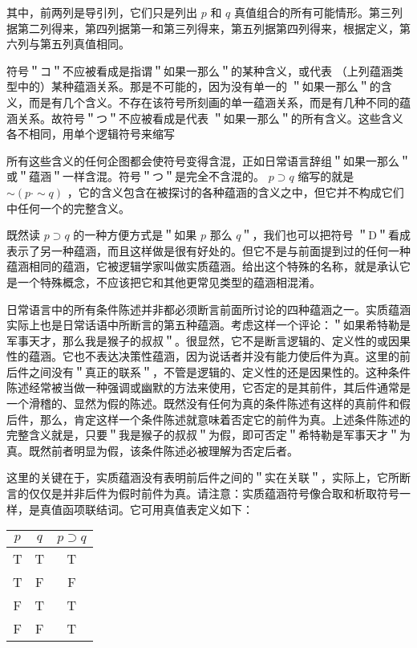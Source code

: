 其中，前两列是导引列，它们只是列出 $p$ 和 $q$ 真值组合的所有可能情形。第三列据第二列得来，第四列据第一和第三列得来，第五列据第四列得来，根据定义，第六列与第五列真值相同。

符号＂コ＂不应被看成是指谓＂如果一那么＂的某种含义，或代表 （上列蕴涵类型中的）某种蕴涵关系。那是不可能的，因为没有单一的 ＂如果一那么＂的含义，而是有几个含义。不存在该符号所刻画的单一蕴涵关系，而是有几种不同的蕴涵关系。故符号＂つ＂不应被看成是代表 ＂如果一那么＂的所有含义。这些含义各不相同，用单个逻辑符号来缩写

所有这些含义的任何企图都会使符号变得含混，正如日常语言辞组＂如果一那么＂或＂蕴涵＂一样含混。符号＂つ＂是完全不含混的。 $p \supset q$ 缩写的就是 $\sim(p \cdot \sim q)$ ，它的含义包含在被探讨的各种蕴涵的含义之中，但它并不构成它们中任何一个的完整含义。

既然读 $p \supset q$ 的一种方便方式是＂如果 $p$ 那么 $q$＂，我们也可以把符号 ＂D＂看成表示了另一种蕴涵，而且这样做是很有好处的。但它不是与前面提到过的任何一种蕴涵相同的蕴涵，它被逻辑学家叫做实质蕴涵。给出这个特殊的名称，就是承认它是一个特殊概念，不应该把它和其他更常见类型的蕴涵相混淆。

日常语言中的所有条件陈述并非都必须断言前面所讨论的四种蕴涵之一。实质蕴涵实际上也是日常话语中所断言的第五种蕴涵。考虑这样一个评论：＂如果希特勒是军事天才，那么我是猴子的叔叔＂。很显然，它不是断言逻辑的、定义性的或因果性的蕴涵。它也不表达决策性蕴涵，因为说话者并没有能力使后件为真。这里的前后件之间没有＂真正的联系＂，不管是逻辑的、定义性的还是因果性的。这种条件陈述经常被当做一种强调或幽默的方法来使用，它否定的是其前件，其后件通常是一个滑稽的、显然为假的陈述。既然没有任何为真的条件陈述有这样的真前件和假后件，那么，肯定这样一个条件陈述就意味着否定它的前件为真。上述条件陈述的完整含义就是，只要＂我是猴子的叔叔＂为假，即可否定＂希特勒是军事天才＂为真。既然前者明显为假，该条件陈述必被理解为否定后者。

这里的关键在于，实质蕴涵没有表明前后件之间的＂实在关联＂，实际上，它所断言的仅仅是并非后件为假时前件为真。请注意：实质蕴涵符号像合取和析取符号一样，是真值函项联结词。它可用真值表定义如下：

\begin{center}
\begin{tabular}{|ccc|}
\hline
$p$ & $q$ & $p \supset q$ \\
\hline
T & T & T \\
T & F & F \\
F & T & T \\
F & F & T \\
\hline
\end{tabular}
\end{center}

